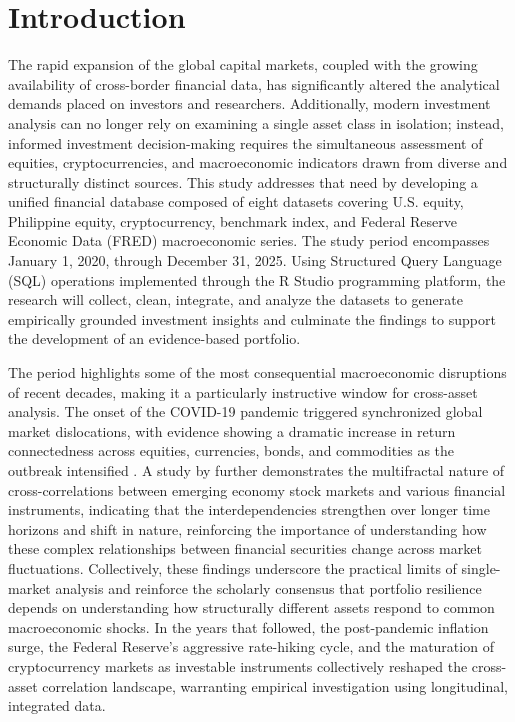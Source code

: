 \section{Introduction}

The rapid expansion of the global capital markets, coupled with the growing availability of cross-border financial data, has significantly altered the analytical demands placed on investors and researchers. Additionally, modern investment analysis can no longer rely on examining a single asset class in isolation; instead, informed investment decision-making requires the simultaneous assessment of equities, cryptocurrencies, and macroeconomic indicators drawn from diverse and structurally distinct sources. This study addresses that need by developing a unified financial database composed of eight datasets covering U.S. equity, Philippine equity, cryptocurrency, benchmark index, and Federal Reserve Economic Data (FRED) macroeconomic series. The study period encompasses January 1, 2020, through December 31, 2025. Using Structured Query Language (SQL) operations implemented through the R Studio programming platform, the research will collect, clean, integrate, and analyze the datasets to generate empirically grounded investment insights and culminate the findings to support the development of an evidence-based portfolio. 

The period highlights some of the most consequential macroeconomic disruptions of recent decades, making it a particularly instructive window for cross-asset analysis. The onset of the COVID-19 pandemic triggered synchronized global market dislocations, with evidence showing a dramatic increase in return connectedness across equities, currencies, bonds, and commodities as the outbreak intensified \parencite{bouri2021connectedness}. A study by \parencite{acikgoz2026multifractal} further demonstrates the multifractal nature of cross-correlations between emerging economy stock markets and various financial instruments, indicating that the interdependencies strengthen over longer time horizons and shift in nature, reinforcing the importance of understanding how these complex relationships between financial securities change across market fluctuations. Collectively, these findings underscore the practical limits of single-market analysis and reinforce the scholarly consensus that portfolio resilience depends on understanding how structurally different assets respond to common macroeconomic shocks. In the years that followed, the post-pandemic inflation surge, the Federal Reserve's aggressive rate-hiking cycle, and the maturation of cryptocurrency markets as investable instruments collectively reshaped the cross-asset correlation landscape, warranting empirical investigation using longitudinal, integrated data. 

